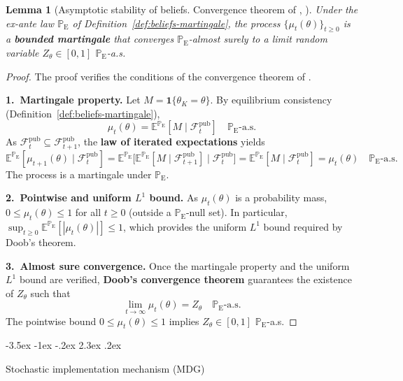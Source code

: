 \documentclass[12pt]{article}
\makeatletter
\numberwithin{equation}{section}
\numberwithin{table}{section}
\newtheorem{lemma}[theorem]{Lemma}
\theoremstyle{definition}
\newcommand{\E}{\mathbb{E}}
\newcommand{\ProbE}{\mathbb{P}_{\mathrm{E}}}
\renewcommand\section{\@startsection {section}{1}{\z@}%
                                   {-3.5ex \@plus -1ex \@minus -.2ex}%
                                   {2.3ex \@plus.2ex}%
                                   {\normalfont\Large\bfseries\raggedright}}
\makeatother
\begin{document}
\bigskip

\begin{lemma}[Asymptotic stability of beliefs. Convergence theorem of
\citeauthor{Doob1953Stochastic}, \citeyear{Doob1953Stochastic}]
\label{lem:asymptotic-beliefs}
Under the ex-ante law $\ProbE$ of
Definition~\ref{def:beliefs-martingale}, the process
$\{\mu_t(\theta)\}_{t\ge 0}$ is a \textbf{bounded martingale} that converges
$\ProbE$-almost surely to a limit random variable
$Z_\theta\in[0,1]$ $\ProbE$-a.s.
\end{lemma}

\begin{proof}
The proof verifies the conditions of the convergence theorem of
\citet{Doob1953Stochastic,Williams1991Martingales,Shiryaev2019Probability}.

\smallskip
\noindent\textbf{1.~Martingale property.}
Let $M=\mathbf{1}\{\theta_K=\theta\}$. By equilibrium consistency
(Definition~\ref{def:beliefs-martingale}),
\[
\mu_t(\theta)=\E^{\ProbE}[M\mid\mathcal{F}_t^{\mathrm{pub}}]\quad\ProbE\text{-a.s.}
\]
As $\mathcal{F}_t^{\mathrm{pub}}\subseteq\mathcal{F}_{t+1}^{\mathrm{pub}}$,
the \textbf{law of iterated expectations} yields
\[
\E^{\ProbE}[\mu_{t+1}(\theta)\mid\mathcal{F}_t^{\mathrm{pub}}]
=\E^{\ProbE}\!\bigl[\E^{\ProbE}[M\mid\mathcal{F}_{t+1}^{\mathrm{pub}}]
                     \mid\mathcal{F}_t^{\mathrm{pub}}\bigr]
=\E^{\ProbE}[M\mid\mathcal{F}_t^{\mathrm{pub}}]
=\mu_t(\theta)\quad\ProbE\text{-a.s.}
\]
The process is a martingale under $\ProbE$.

\smallskip
\noindent\textbf{2.~Pointwise and uniform $L^1$ bound.}
As $\mu_t(\theta)$ is a probability mass,
$0\le\mu_t(\theta)\le 1$ for all $t\ge 0$ (outside a
$\ProbE$-null set). In particular,
$\sup_{t\ge 0}\E^{\ProbE}[|\mu_t(\theta)|]\le 1$, which provides the
uniform $L^1$ bound required by Doob's theorem.

\smallskip
\noindent\textbf{3.~Almost sure convergence.}
Once the martingale property and the uniform $L^1$ bound are verified,
\textbf{Doob's convergence theorem} guarantees the existence of
$Z_\theta$ such that
\[
\lim_{t\to\infty}\mu_t(\theta)=Z_\theta\quad\ProbE\text{-a.s.}
\]
The pointwise bound $0\le\mu_t(\theta)\le 1$ implies $Z_\theta\in[0,1]$
$\ProbE$-a.s.
\end{proof}

\section{Stochastic implementation mechanism (MDG)}
\label{sec:mdg}
\end{document}
